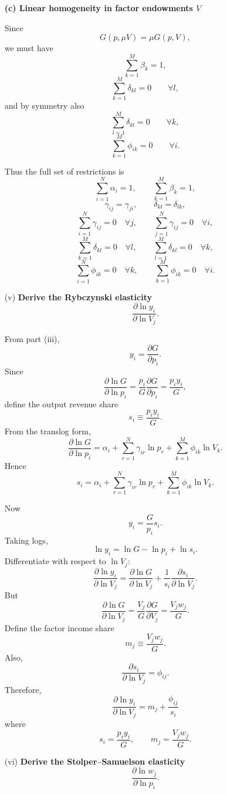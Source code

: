 \begin{enumerate}
\medskip

\textbf{(c) Linear homogeneity in factor endowments $V$}

Since
\[
G(p,\mu V)=\mu G(p,V),
\]
we must have
\[
\sum_{k=1}^M \beta_k = 1,
\]
\[
\sum_{k=1}^M \delta_{kl}=0
\qquad
\forall l,
\]
and by symmetry also
\[
\sum_{l=1}^M \delta_{kl}=0
\qquad
\forall k,
\]
\[
\sum_{k=1}^M \phi_{ik}=0
\qquad
\forall i.
\]

Thus the full set of restrictions is
\[
\sum_{i=1}^N \alpha_i=1,
\qquad
\sum_{k=1}^M \beta_k=1,
\]
\[
\gamma_{ij}=\gamma_{ji},
\qquad
\delta_{kl}=\delta_{lk},
\]
\[
\sum_{i=1}^N \gamma_{ij}=0 \quad \forall j,
\qquad
\sum_{j=1}^N \gamma_{ij}=0 \quad \forall i,
\]
\[
\sum_{k=1}^M \delta_{kl}=0 \quad \forall l,
\qquad
\sum_{l=1}^M \delta_{kl}=0 \quad \forall k,
\]
\[
\sum_{i=1}^N \phi_{ik}=0 \quad \forall k,
\qquad
\sum_{k=1}^M \phi_{ik}=0 \quad \forall i.
\]

\bigskip

\item[(v)] \textbf{Derive the Rybczynski elasticity}
\[
\frac{\partial \ln y_i}{\partial \ln V_j}.
\]

From part (iii),
\[
y_i=\frac{\partial G}{\partial p_i}.
\]
Since
\[
\frac{\partial \ln G}{\partial \ln p_i}
=
\frac{p_i}{G}\frac{\partial G}{\partial p_i}
=
\frac{p_i y_i}{G},
\]
define the output revenue share
\[
s_i \equiv \frac{p_i y_i}{G}.
\]
From the translog form,
\[
\frac{\partial \ln G}{\partial \ln p_i}
=
\alpha_i+\sum_{r=1}^N \gamma_{ir}\ln p_r+\sum_{k=1}^M \phi_{ik}\ln V_k.
\]
Hence
\[
s_i
=
\alpha_i+\sum_{r=1}^N \gamma_{ir}\ln p_r+\sum_{k=1}^M \phi_{ik}\ln V_k.
\]

Now
\[
y_i=\frac{G}{p_i}s_i.
\]
Taking logs,
\[
\ln y_i=\ln G-\ln p_i+\ln s_i.
\]
Differentiate with respect to $\ln V_j$:
\[
\frac{\partial \ln y_i}{\partial \ln V_j}
=
\frac{\partial \ln G}{\partial \ln V_j}
+
\frac{1}{s_i}\frac{\partial s_i}{\partial \ln V_j}.
\]
But
\[
\frac{\partial \ln G}{\partial \ln V_j}
=
\frac{V_j}{G}\frac{\partial G}{\partial V_j}
=
\frac{V_j w_j}{G}.
\]
Define the factor income share
\[
m_j \equiv \frac{V_j w_j}{G}.
\]
Also,
\[
\frac{\partial s_i}{\partial \ln V_j}=\phi_{ij}.
\]
Therefore,
\[
\boxed{
\frac{\partial \ln y_i}{\partial \ln V_j}
=
m_j+\frac{\phi_{ij}}{s_i}
}
\]
where
\[
s_i=\frac{p_i y_i}{G},
\qquad
m_j=\frac{V_j w_j}{G}.
\]

\bigskip

\item[(vi)] \textbf{Derive the Stolper--Samuelson elasticity}
\[
\frac{\partial \ln w_j}{\partial \ln p_i}.
\]


\end{enumerate}
